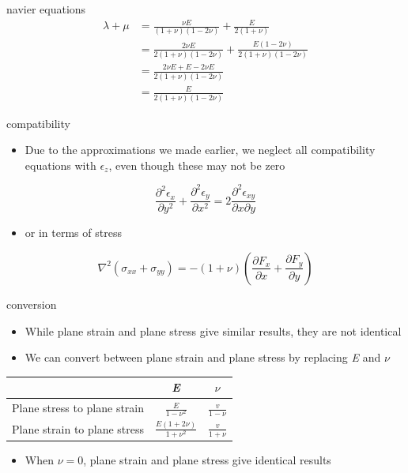 \documentclass[
  letterpaper,
  ignorenonframetext,
  aspectratio=43,
  handout,
  12pt]{beamer}
\providecommand{\tightlist}{%
  \setlength{\itemsep}{0pt}\setlength{\parskip}{0pt}}
\providecommand{\tightlist}{%
\setlength{\itemsep}{0pt}\setlength{\parskip}{0pt}}
\begin{document}
\begin{frame}{navier equations}
\protect\hypertarget{navier-equations-1}{}
\[\begin{aligned}
    \lambda + \mu &= \frac{\nu E}{(1+\nu)(1-2\nu)} + \frac{E}{2(1+\nu)}\\
    &= \frac{2\nu E}{2(1+\nu)(1-2\nu)} + \frac{E(1-2\nu)}{2(1+\nu)(1-2\nu)}\\
    &= \frac{2\nu E + E - 2\nu E}{2(1+\nu)(1-2\nu)}\\
    &= \frac{E}{2(1+\nu)(1-2\nu)}
\end{aligned}\]
\end{frame}

\begin{frame}{compatibility}
\protect\hypertarget{compatibility-1}{}
\begin{itemize}
\tightlist
\item
  Due to the approximations we made earlier, we neglect all
  compatibility equations with \(\epsilon_z\), even though these may not
  be zero
\end{itemize}

\[\frac{\partial^2 \epsilon_x}{\partial y^2} + \frac{\partial^2 \epsilon_y}{\partial x^2} = 2 \frac{\partial^2 \epsilon_{xy}}{\partial x \partial y}\]

\begin{itemize}
\tightlist
\item
  or in terms of stress
\end{itemize}

\[\nabla^2 (\sigma_{xx} + \sigma_{yy}) = -(1+\nu)\left(\frac{\partial F_x}{\partial x} + \frac{\partial F_y}{\partial y}\right)\]
\end{frame}

\begin{frame}{conversion}
\protect\hypertarget{conversion}{}
\begin{itemize}
\tightlist
\item
  While plane strain and plane stress give similar results, they are not
  identical
\item
  We can convert between plane strain and plane stress by replacing
  \emph{E} and \(\nu\)
\end{itemize}

\begin{longtable}[]{@{}ccc@{}}
\toprule
& \emph{E} & \(\nu\) \\
\midrule
\endhead
Plane stress to plane strain & \(\frac{E}{1-\nu^2}\) &
\(\frac{v}{1-\nu}\) \\
Plane strain to plane stress & \(\frac{E(1+2\nu)}{1+\nu^2}\) &
\(\frac{v}{1+\nu}\) \\
\bottomrule
\end{longtable}

\begin{itemize}
\tightlist
\item
  When \(\nu = 0\), plane strain and plane stress give identical results
\end{itemize}
\end{frame}
\end{document}
